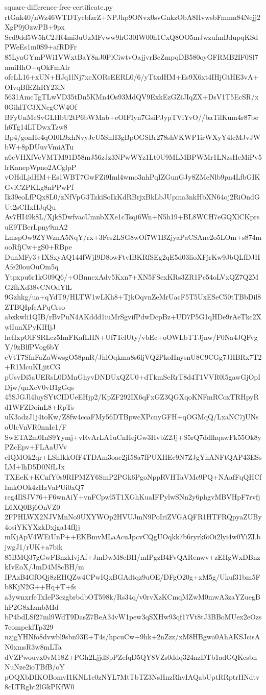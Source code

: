 \documentclass[11pt]{article}
\theoremstyle{definition}
\theoremstyle{remark}
\begin{document}
\begin{filecontents*}[overwrite]{square-difference-free-certificate.py}
rtGnk40/nWz46WTDTycbfzrZ+NPJhp9ONvx0svGnkzObA8HvwsbFmnm84Ncjj2XgP9jOzwPB+9px
Scd9dd5W5hC2JR4mi3uUzMFvww9hG30IW00h1CxQ8OO5mJwzufmBdupqKSdPWeEs1m0S9+afRDFr
85LyaGYmPWi1VWxtBaY8nJ0PlCiwtvOajjvrBcZmpqDB580oyGFRMB2IF0Sl7muiHhO+qOkFmAlr
ofeLL16+xUN+HJq1lNj7xcXORsEERL0/6/yTtxdHM+Es9X6xt4IHjGtHE3vA+OIvqBfEZhRY23lN
5631AmcTgTLwVD35tDn5KMn4Os93MdQV9ExkEzGZiJIqZX+DsV1T5EcSR/x0GihlTC3XNcgCW4Of
BFyUnMeSvGLHbU2tP6bWMab+eOIFIyn7GsiPJypTViYvO//baTilKum4r87beh6Tg14LTDwxTzw8
Bp4/gonHe4qOI0L9xhNvyJcU5SnH3gBpOGSBr278shVKWP1irWXyY4lcMJvJWbW+8pDUuvVmiATu
a6cVHXfVcVMTM91D58mJ56zJz3NPwWYz1Lt0U9MLMBPWMr1LNzsHeMiPv5lrKanepWpno2ACglpP
vOHdLjdHM+Es1WBT7GwFZi9Iml4wmo3nhPqIZGunGJy8ZMeNlb9pn4LfbGIKGviCZPKLg8nPPwPf
Ik39eoLfPQx8L0/zNfVpG3TzkiSoIkKdRBrjxBkLbJUpma3nkHbXN64oj2RiOndGUt2sCHxHJqQu
Av7HI49k8L/Xjk8DwfvacUmnbXXe1cTsqi6Wn+N5h19+BL8WCH7eGQXlCKprsuE9TBerLpny9mA2
LmspOw9ZYWznA5NqY/rx+3Fes2LSG8wOf7W1BZjyaPaCSAne2o5LOm+s874mooRfjCw+gS0+RBpe
DunMFy3+IXSxyAQ144fWjI9D8owFtvIBKRfSEg2qE5d03lioXFjrKw9JbQLfDJHAfe20ouOuOm5q
Ytpxpu6r1kG09Q6/+OBnncxAdv5Kxn7+XN5FSexKRs3ZR1Pc54oLVxQZ7Q2MG2fkXd38vCNOdYlL
9Gzhkg/ua+qYdT9/HLTW1wLKh8+TjkOqvnZeMrUacF5T5UxESeC50tTBbDil8ZTBQIpfeAPqCrso
abxkwli1QIB/rBvPuN4AKddd1iuMrSgvifPdwDcpBz+UD7P5G1qHDe9rAeTkc2XwlIunXPyKIHjJ
hcfIxpOlFSRLcz5ImFKafLHN+Uf7TclUty/vbEc+oOWLbTTJjnw/F0Na4JQFvgY/9zBlfPVog6bY
cVtT7SfnFaZaWwsgO58pnR/JhlOqkma8s6ljVQ2PkoHnysnU8C9CGg7JHBRx7T2+R1McuKLjitCG
pUsvDi5aUERsL0DMnGhyvDNDUxQZU0+dTkmSeRrT8d4T1VVR0l5gawGjOpIDjw/qnXeV0vB1gGqs
45SJGJl4luySYtCIDUeEHjp2/KpZF292IX6qFxGZ3QGXqoKNFmRCoxTRHpyRd1WFZDoinL8+RpTs
uK3adzJ1j4toKw/Z8fw4ccaFMy56DTBpwcXPcnyGFH+qOGMqQ/LxaNC7jUNsoUlcVnVR0nnIc1/F
SwETA2m0InS9Yymj+vRvArLA1uCnHejGw3HvbZ2Jj+S5rQ7ddlhqawFk55Ok8yPZcEpv+FLAaUVv
eIQMOk2qr+LShIkkOfF4TDAm3oac2jI58a7fPUXHEc9N7ZJgYhANFtQAP43ESsLM+lhD5D0NfLJx
TXEeK+KCnfY0s9RIPMZY6SmP2PGk6PgoNppRVHTaVMc9PQ+NAafFqQHCfImkOOk4zHzVaPUi0xQ7
reg4IlSJV76+F6wnAiY+vnFCpwl5T1XGhKuaIFPylwSNn2y6phgvMBVHpF7rvfjL6XQ0Bj6OnVZ0
2FPHLWX2NJVMnNo9UXYWOp2HVUJmN9PoIriZVGAQFR1HTFRQpyaZUBy4osiYKYXzkDxjga14fIjj
mKjApV4WEiUnP++EKBmvMLaAcuJpcvCQgUOqkk7b6ryrk6iOi2lyi4w0YiZLbjwgJ1/rUK+a7bik
85BMQ37gGwFBnzkIvjAf+JmDwM8cBH/mIPgzB4FvQARenwv+zEHgWxDBnzkIvEoX/JmD4M8cBH/m
IPAzB4GfOQj8zEHQZw4CPwIQxBGAdtqz9uOE/DFgO20g+xM5g/Ukuf31bm5Fb8KjN2G++Hq+T+fs
a3ywnxrfeTxIeP3czgbrbdbOT598k/Rs34q/v0rvXzKCmqMZwM0mwA3zaYZuegBhP2G8xIzmbMId
bP4bdLSf27ml9WdT9DasZ7BeA34vW1pew3qSXHw93qf17Vt8tJ3BBoMUex2eOzs7eompeklTp329
nzjgYHNfo8dvwbl9sbn93E+T4s/hpcuCw+9hk+2nZzz/xM8HBgwa0AhAKSJcisAN6xmsR3w8mLTa
dVZPwouvx0vM18Z+PGh2LjjdSpPZefqD5QY8VZs0ddq324nzDTb1adGQKcsbnNuNze2ioTBfB/oY
pOQXbDIKOBomvI1KNL1c0zNYL7MtTbTZ3NsHnzRhvIAQabUptRRptrHNdtv8cLTRght2lGkPKfW0

\end{filecontents*}
\end{document}

